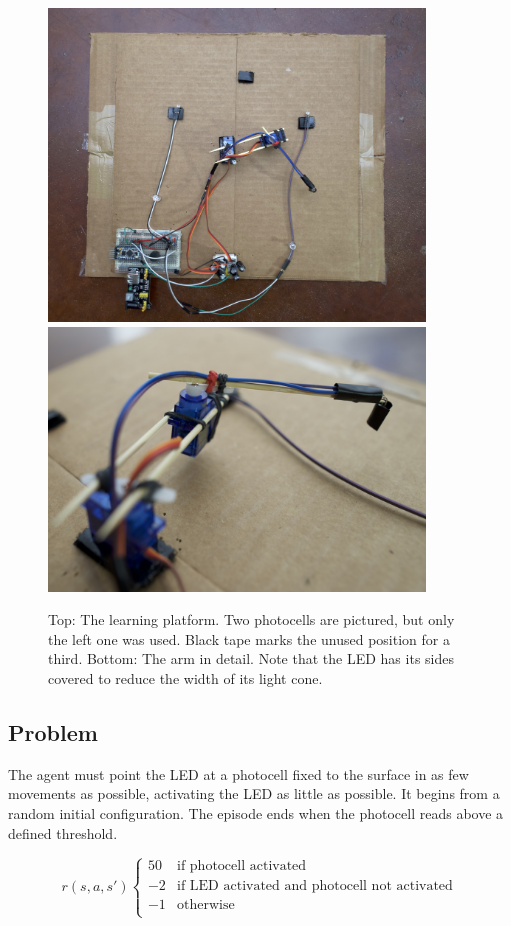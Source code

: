 \documentclass{article}
\begin{document}
	
	\begin{figure}
		\centering
		\includegraphics[width=10cm]{../photos/eagle_small.jpg}
		\includegraphics[width=10cm]{../photos/arm_detail_small.jpg}
		\caption{Top: The learning platform. Two photocells are pictured, but only the left one was used. Black tape marks the unused position for a third. Bottom: The arm in detail. Note that the LED has its sides covered to reduce the width of its light cone. }
		\label{fig:platform}
	\end{figure}
	
	
	\subsection{Problem}
	
	The agent must point the LED at a photocell fixed to the surface in as few movements as possible, activating the LED as little as possible. It begins from a random initial configuration. The episode ends when the photocell reads above a defined threshold. 
	
	\[ r(s,a,s')  \left\{
	\begin{array}{ll}
		50 & \text{if photocell activated} \\
		-2 & \text{if LED activated and photocell not activated} \\
		-1 & \text{otherwise} \\
	\end{array} 
	\right. \]
	
\end{document}
